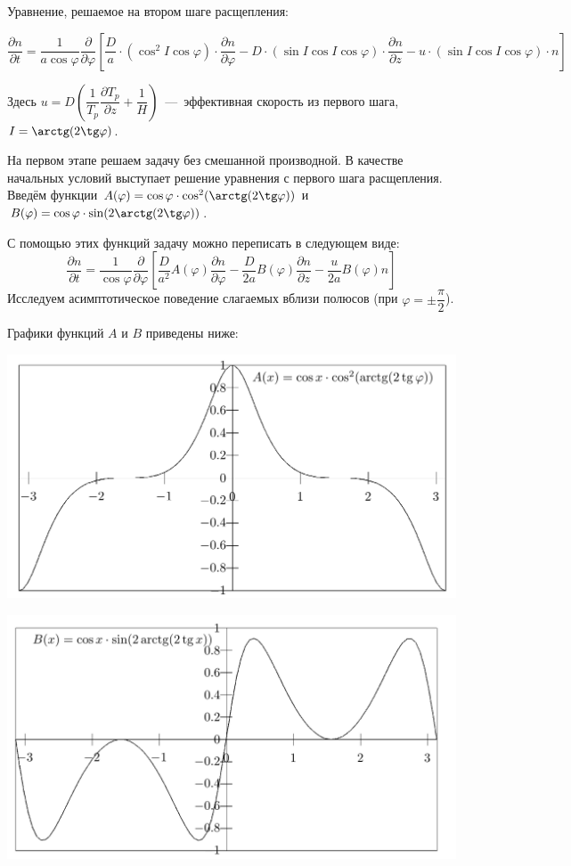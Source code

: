 \documentclass[2pt, a4paper, fleqn]{extarticle}
\begin{document}
Уравнение, решаемое на втором шаге расщепления:

$$\dfrac{\partial n}{\partial t} = \dfrac{1}{a\cos\varphi} \dfrac{\partial }{\partial \varphi}\left[\dfrac{D}{a}\cdot(\cos^2  I \cos\varphi)\cdot\dfrac{\partial n}{\partial \varphi}-D\cdot(\sin I\cos I\cos\varphi)\cdot \dfrac{\partial n}{\partial z} - u\cdot(\sin I \cos I \cos\varphi)\cdot n \right]$$

Здесь $u = D\left(\dfrac{1}{T_p}\dfrac{\partial T_p}{\partial z}+\dfrac{1}{H}\right)$~---~эффективная скорость из первого шага, $I = \arctg(2\tg \varphi)$.

На первом этапе решаем задачу без смешанной производной. В качестве начальных условий выступает решение уравнения с первого шага расщепления. Введём функции $A(\varphi) = \cos \varphi \cdot \cos^2(\arctg(2\tg \varphi))$ и $B(\varphi) = \cos\varphi \cdot \sin(2\arctg(2\tg \varphi))$.

С помощью этих функций задачу можно переписать в следующем виде: 
$$\dfrac{\partial n}{\partial t} = \dfrac{1}{\cos\varphi} \dfrac{\partial }{\partial \varphi}\left[\dfrac{D}{a^2}A(\varphi)\dfrac{\partial n}{\partial \varphi}-\dfrac{D}{2a}B(\varphi) \dfrac{\partial n}{\partial z} - \dfrac{u}{2a}B(\varphi) n \right]$$
Исследуем асимптотическое поведение слагаемых вблизи полюсов (при $\varphi = \pm\dfrac{\pi}{2}$).

Графики функций $A$ и $B$ приведены ниже: 

\includegraphics[scale=0.3]{A}

\includegraphics[scale=0.3]{B}
\end{document}
